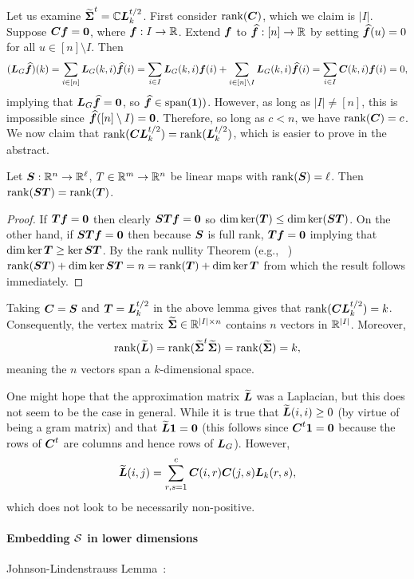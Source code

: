 Let us examine $\widetilde{\boldsymbol{\Sigma}}^t=\mathbb{C}\vb*{L}_k^{t/2}$. First consider $\rank(\vb*{C})$, which we claim is $|I|$. Suppose $\vb*{C}\vb*{f}=\vb{0}$, where $\vb*{f}:I \to \mathbb{R}$. Extend $\vb*{f}$ to $\vb*{\widehat{f}}:[n]\to\mathbb{R}$ by setting $\vb*{\widehat{f}}(u)=0$ for all $u\in [n]\setminus I$. Then 
\[(\vb*{L}_G\vb*{\widehat{f}})(k) = \sum_{i\in[n]}\vb*{L}_G(k,i)\vb*{\widehat{f}}(i) = \sum_{i\in I}\vb*{L}_G(k,i) \vb*{f}(i) + \sum_{i\in[n]\setminus I} \vb*{L}_G(k,i)\vb*{\widehat{f}}(i) = \sum_{i\in I}\vb*{C}(k,i) \vb*{f}(i) = 0,\]
implying that $\vb*{L}_G\vb*{\widehat{f}}=\vb{0}$, so $\vb*{\widehat{f}}\in\textnormal{span}(\vb{1}))$. However, as long as $|I|\neq[n]$, this is impossible since  $\vb*{\widehat{f}}([n]\setminus I)=\vb{0}$. Therefore, so long as $c<n$, we have $\rank(\vb*{C}) = c$. 
We now claim that $\rank(\vb*{C}\vb*{L}_k^{t/2}) = \rank(\vb*{L}_k^{t/2})$, which is easier to prove in the abstract. 

\begin{lemma}
	Let $\vb*{S}:\mathbb{R}^n\to\mathbb{R}^\ell$, $T\in\mathbb{R}^m\to\mathbb{R}^n$ be linear maps with $\rank(\vb*{S})=\ell$. Then $\rank(\vb*{S}\vb*{T}) = \rank(\vb*{T})$. 
\end{lemma}
\begin{proof}
	If $\vb*{T}\vb*{f}=\vb{0}$ then clearly $\vb*{S}\vb*{T}\vb*{f}=\vb{0}$ so $\dim\ker(\vb*{T})\leq \dim\ker(\vb*{S}\vb*{T})$. On the other hand, if $\vb*{S}\vb*{T}\vb*{f}=\vb{0}$ then because $\vb*{S}$ is full rank, $\vb*{T}\vb*{f}=\vb{0}$ implying that $\dim \ker \vb*{T}\ge \ker\vb*{S}\vb*{T}$. 	By the rank nullity Theorem (e.g., ~\cite{axler1997linear}) $\rank(\vb*{S}\vb*{T}) + \dim\ker \vb*{S}\vb*{T} = n = \rank(\vb*{T}) + \dim\ker\vb*{T}$ from which the result follows immediately. 
\end{proof}

Taking $\vb*{C}=\vb*{S}$ and $\vb*{T}=\vb*{L}_k^{t/2}$ in the above lemma gives that $\rank(\vb*{C}\vb*{L}_k^{t/2})=k$. Consequently, the vertex matrix $\widetilde{\boldsymbol{\Sigma}}\in\mathbb{R}^{|I|\times n}$ contains $n$ vectors in $\mathbb{R}^{|I|}$. Moreover, 
\[\rank(\widetilde{\vb*{L}}) = \rank(\widetilde{\boldsymbol{\Sigma}}^t \widetilde{\boldsymbol{\Sigma}}) = \rank(\widetilde{\boldsymbol{\Sigma}})=k,\]
meaning the $n$ vectors span a $k$-dimensional space. 

One might hope that the approximation matrix $\widetilde{\vb*{L}}$ was a Laplacian, but this does not seem to be the case in general. While it is true that $\widetilde{\vb*{L}}(i,i)\geq 0$ (by virtue of being a gram matrix) and that $\widetilde{\vb*{L}}\vb{1}=\vb{0}$ (this follows since $\vb*{C}^t\vb{1} =\vb{0}$ because the rows of $\vb*{C}^t$ are columns and hence rows of $\vb*{L}_G$). However, 
\[\widetilde{\vb*{L}}(i,j) = \sum_{r,s=1}^c \vb*{C}(i,r)\vb*{C}(j,s)\vb*{L}_k(r,s),\]
which does not look to be necessarily non-positive. 





\paragraph{Embedding \texorpdfstring{$\mathcal{S}$}{the simplex} in lower dimensions}
Johnson-Lindenstrauss Lemma~\cite{johnson1984extensions,dasgupta2003elementary}: 

